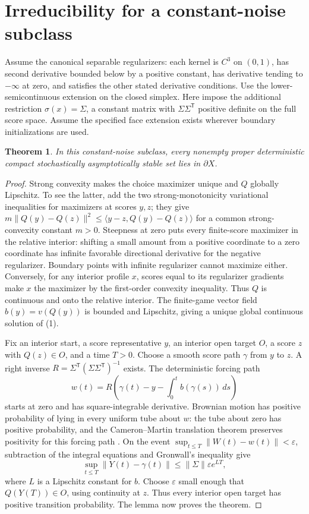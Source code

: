 \documentclass[11pt]{article}
\newtheorem{theorem}{Theorem}
\theoremstyle{definition}
\begin{document}
\section*{Irreducibility for a constant-noise subclass}
Assume the canonical separable regularizers: each kernel is $C^3$ on
$(0,1)$, has second derivative bounded below by a positive constant,
has derivative tending to $-\infty$ at zero, and satisfies the other
stated derivative conditions. Use the lower-semicontinuous extension
on the closed simplex. Here impose the additional restriction
$\sigma(x)=\Sigma$, a constant matrix with
$\Sigma\Sigma^{\mathsf T}$ positive definite on the full score space.
Assume the specified face extension exists wherever boundary
initializations are used.

\begin{theorem}
In this constant-noise subclass, every nonempty proper deterministic
compact stochastically asymptotically stable set lies in $\partial X$.
\end{theorem}
\begin{proof}
Strong convexity makes the choice maximizer unique and $Q$ globally
Lipschitz. To see the latter, add the two strong-monotonicity
variational inequalities for maximizers at scores $y,z$; they give
$m\|Q(y)-Q(z)\|^2\le\langle y-z,Q(y)-Q(z)\rangle$ for a
common strong-convexity constant $m>0$. Steepness at zero puts every
finite-score maximizer in the relative interior: shifting a small
amount from a positive coordinate to a zero coordinate has infinite
favorable directional derivative for the negative regularizer.
Boundary points with infinite regularizer cannot maximize either.
Conversely, for any interior profile $x$, scores equal to its
regularizer gradients make $x$ the maximizer by the first-order
convexity inequality. Thus $Q$ is continuous and onto the relative
interior. The finite-game vector field $b(y)=v(Q(y))$ is bounded
and Lipschitz, giving a unique global continuous solution of (1).

Fix an interior start, a score representative $y$, an interior open
target $O$, a score $z$ with $Q(z)\in O$, and a time $T>0$.
Choose a smooth score path $\gamma$ from $y$ to $z$. A right inverse
$R=\Sigma^{\mathsf T}(\Sigma\Sigma^{\mathsf T})^{-1}$ exists.
The deterministic forcing path
\[
 w(t)=R\left(\gamma(t)-y-\int_0^t b(\gamma(s))\,ds\right)
\]
starts at zero and has square-integrable derivative. Brownian motion
has positive probability of lying in every uniform tube about $w$:
the tube about zero has positive probability, and the Cameron--Martin
translation theorem preserves positivity for this forcing path
\cite[Section 1.4]{mp}. On the event
$\sup_{t\le T}\|W(t)-w(t)\|<\varepsilon$, subtraction of the
integral equations and Gronwall's inequality give
\[
 \sup_{t\le T}\|Y(t)-\gamma(t)\|
       \le\|\Sigma\|\varepsilon e^{LT},
\]
where $L$ is a Lipschitz constant for $b$. Choose $\varepsilon$ small
enough that $Q(Y(T))\in O$, using continuity at $z$. Thus every
interior open target has positive transition probability. The lemma
now proves the theorem.
\end{proof}
\end{document}
